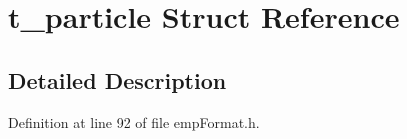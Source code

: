 \hypertarget{structt__particle}{}\section{t\+\_\+particle Struct Reference}
\label{structt__particle}


\subsection{Detailed Description}


Definition at line 92 of file emp\+Format.\+h.


